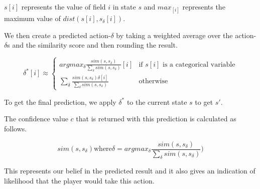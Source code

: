 $s[i]$ represents the value of field $i$ in state $s$ and $max_[i]$ represents the maximum value of $dist(s[i], s_{\delta}[i])$. 

We then create a predicted action-$\delta$ by taking a weighted average over the action-$\delta$s and the similarity score and then rounding the result.

$$\delta^*[i] \approx
\begin{cases}
argmax_\delta \frac{sim(s, s_{\delta})}{\sum_\delta sim(s, s_{\delta})}[i] & \text{if $s[i]$ is a categorical variable} \\
\sum_\delta \frac{sim(s, s_{\delta}) \delta[i] }{\sum_\delta sim(s, s_{\delta})} & \text{otherwise}
\end{cases}
$$

To get the final prediction, we apply $\delta^*$ to the current state $s$ to get $s'$.

The confidence value $c$ that is returned with this prediction is calculated as follows.

$$sim(s, s_{\delta}) \text{where} \delta = argmax_\delta \frac{sim(s, s_{\delta})}{\sum_\delta sim(s, s_{\delta})})$$

This represents our belief in the predicted result and it also gives an indication of likelihood that the player would take this action.






